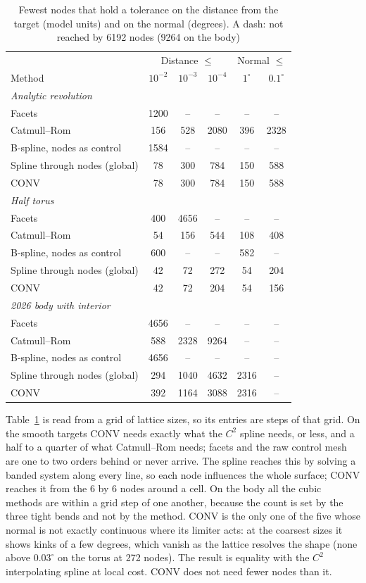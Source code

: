\documentclass[journal]{IEEEtran}
\begin{document}
\begin{table}[H]
\caption{Fewest nodes that hold a tolerance on the distance from the
target (model units) and on the normal (degrees). A dash: not reached by
6192 nodes (9264 on the body)}
\label{tab:budget}
\centering
\scriptsize
\setlength{\tabcolsep}{2.4pt}
\begin{tabular}{l|ccc|cc}
\hline
 & \multicolumn{3}{c|}{Distance $\le$} & \multicolumn{2}{c}{Normal $\le$}\\
Method & $10^{-2}$ & $10^{-3}$ & $10^{-4}$ & $1^\circ$ & $0.1^\circ$\\
\hline
\multicolumn{6}{l}{\emph{Analytic revolution}}\\
Facets & 1200 & -- & -- & -- & --\\
Catmull--Rom & 156 & 528 & 2080 & 396 & 2328\\
B-spline, nodes as control & 1584 & -- & -- & -- & --\\
Spline through nodes (global) & 78 & 300 & 784 & 150 & 588\\
CONV & 78 & 300 & 784 & 150 & 588\\
\hline
\multicolumn{6}{l}{\emph{Half torus}}\\
Facets & 400 & 4656 & -- & -- & --\\
Catmull--Rom & 54 & 156 & 544 & 108 & 408\\
B-spline, nodes as control & 600 & -- & -- & 582 & --\\
Spline through nodes (global) & 42 & 72 & 272 & 54 & 204\\
CONV & 42 & 72 & 204 & 54 & 156\\
\hline
\multicolumn{6}{l}{\emph{2026 body with interior}}\\
Facets & 4656 & -- & -- & -- & --\\
Catmull--Rom & 588 & 2328 & 9264 & -- & --\\
B-spline, nodes as control & 4656 & -- & -- & -- & --\\
Spline through nodes (global) & 294 & 1040 & 4632 & 2316 & --\\
CONV & 392 & 1164 & 3088 & 2316 & --\\
\hline
\end{tabular}
\end{table}

Table~\ref{tab:budget} is read from a grid of lattice sizes, so its
entries are steps of that grid. On the smooth targets CONV needs exactly
what the $C^2$ spline needs, or less, and a half to a quarter of what
Catmull--Rom needs; facets and the raw control mesh are one to two orders
behind or never arrive. The spline reaches this by solving a banded
system along every line, so each node influences the whole surface; CONV
reaches it from the 6 by 6 nodes around a cell. On the body all the cubic
methods are within a grid step of one another, because the count is set
by the three tight bends and not by the method. CONV is the only one of
the five whose normal is not exactly continuous where its limiter acts:
at the coarsest sizes it shows kinks of a few degrees, which vanish as
the lattice resolves the shape (none above $0.03^\circ$ on the torus at
272 nodes). The result is equality with the $C^2$ interpolating spline
at local cost. CONV does not need fewer nodes than it.
\end{document}
